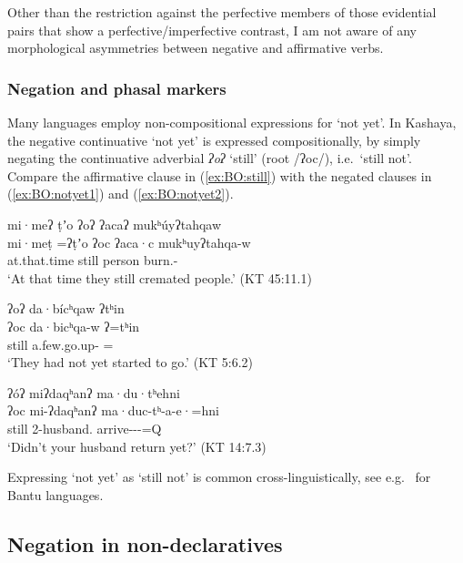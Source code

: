 \documentclass[output=paper,modfonts,nonflat,colorlinks,citecolor=brown]{langscibook}
\begin{document}
Other than the restriction against the perfective members of those evidential pairs that show a perfective/imperfective contrast, I am not aware of any morphological asymmetries between negative and affirmative verbs.


\subsubsection{Negation and phasal markers}\label{sec:kas:2.1.4}
Many languages employ non-compositional expressions for `not yet'. In Kashaya, the negative continuative `not yet' is expressed compositionally, by simply negating the continuative adverbial \textit{ʔoʔ} `still' (root /ʔoc/), i.e.\ `still not'.
Compare the affirmative clause in (\ref{ex:BO:still}) with the negated clauses in (\ref{ex:BO:notyet1}) and (\ref{ex:BO:notyet2}).

{%
\ea 
\label{ex:BO:still}
\glll mi·meʔ ṭʼo ʔoʔ ʔacaʔ mukʰúyʔtahqaw\\
    mi·meṭ =ʔṭʼo ʔoc ʔaca·c mukʰuyʔtahqa-w\\
    at.that.time  still person burn.-\\
\glt `At that time they still cremated people.' ({KT 45:11.1})\\
\z
}%

{%
\ea 
\label{ex:BO:notyet1}
\glll ʔoʔ da·bícʰqaw ʔtʰin\\
    ʔoc da·bicʰqa-w ʔ=tʰin\\
    still a.few.go.up- =\\
\glt `They had not yet started to go.' ({KT 5:6.2})\\
\z
}%

{%
\ea 
\label{ex:BO:notyet2}
\glll ʔóʔ miʔdaqʰanʔ ma·du·tʰehni\\
    ʔoc mi-ʔdaqʰanʔ ma·duc-tʰ-a-e·=hni\\
    still 2-husband. arrive---=Q\\
\glt `Didn’t your husband return yet?' ({KT 14:7.3})\\
\z
}%

Expressing `not yet' as `still not' is common cross-linguistically, see e.g.\ \citet{VeselinovaDevos2021} for Bantu languages.

\newpage
\subsection{Negation in non-declaratives}\label{sec:BO:proh}
\end{document}
